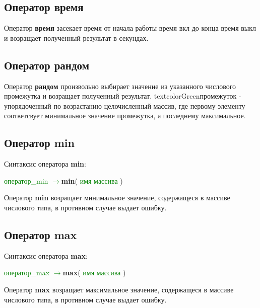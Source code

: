 \documentclass[10pt]{report}
\begin{document}
   \subsection{Оператор время}
      \begin{center}
 \end{center}
 Оператор  \textbf{\glqq  время\grqq } засекает время от начала работы {\glqq время вкл\glqq } до конца {\glqq время выкл\glqq } и возращает полученный результат в секундах.
 
 \subsection{Оператор рандом}
      \begin{center}
 \end{center}
 Оператор  \textbf{\glqq  рандом\grqq } произвольно выбирает значение из указанного числового промежутка и возращает полученный результат. textcolor{Green}{промежуток} - упорядоченный по возрастанию целочисленный массив, где первому элементу соответсвует минимальное значение промежутка, а последнему максимальное.
 \subsection{Оператор min}
    Синтаксис оператора \textbf{\glqq  min\grqq }:
  \begin{center}
    \textcolor{Green}{оператор_min $\rightarrow$}\textbf{min}( \textcolor{Green}{имя массива} )
 \end{center}
 Оператор \textbf{\glqq  min\grqq } возращает минимальное значение, содержащеся в массиве числового типа, в противном случае выдает ошибку.
 \subsection{Оператор max}
    Синтаксис оператора \textbf{\glqq  max\grqq }:
  \begin{center}
    \textcolor{Green}{оператор_max $\rightarrow$}\textbf{max}( \textcolor{Green}{имя массива} )
 \end{center}
 Оператор \textbf{\glqq max\grqq } возращает максимальное значение, содержащеся в массиве числового типа, в противном случае выдает ошибку.
 
\end{document}
